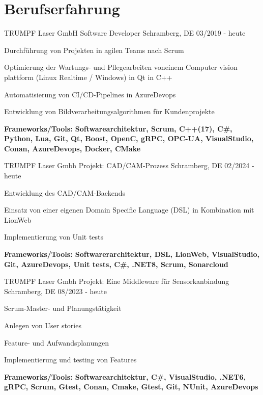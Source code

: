 \section{Berufserfahrung}

\cventry
{TRUMPF Laser GmbH} %
{Software Developer } %
{Schramberg, DE} %
{03/2019 - heute} %
\begin{cvitems}
\item{Durchführung von Projekten in agilen Teams nach Scrum}
\item{Optimierung der Wartungs- und Pflegearbeiten voneinem Computer vision plattform (Linux Realtime / Windows) in Qt in C++}
\item{Automatisierung von CI/CD-Pipelines in AzureDevops}
\item{Entwicklung von Bildverarbeitungsalgorithmen für Kundenprojekte}
\item{\textbf{Frameworks/Tools: Softwarearchitektur, Scrum,  C++(17), C\#, Python, Lua, Git, Qt, Boost, OpenC, gRPC, OPC-UA, VisualStudio, Conan, AzureDevops, Docker, CMake}}
\end{cvitems}

\cventry
{TRUMPF Laser Gmbh} %
{Projekt: CAD/CAM-Prozess} %
{Schramberg, DE} %
{02/2024 - heute} %
\begin{cvitems}
	\item{Entwicklung des CAD/CAM-Backends}
	\item{Einsatz von einer eigenen Domain Specific Language (DSL) in Kombination mit LionWeb}
	\item{Implementierung von Unit tests}
	\item{\textbf{Frameworks/Tools: Softwarerarchitektur, DSL, LionWeb, VisualStudio, Git, AzureDevops, Unit tests, C\#, .NET8, Scrum, Sonarcloud}}
\end{cvitems}

\cventry
{TRUMPF Laser Gmbh} %
{Projekt: Eine Middleware für Sensorkanbindung} %
{Schramberg, DE} %
{08/2023 - heute} %
\begin{cvitems}
	\item{Scrum-Master- und Planungstätigkeit}
	\item{Anlegen von User stories}
	\item{Feature- und Aufwandsplanungen}
	\item{Implementierung und testing von Features}
	\item{\textbf{Frameworks/Tools:  Softwarearchitektur, C\#, VisualStudio, .NET6,  gRPC, Scrum,  Gtest, Conan, Cmake, Gtest, Git, NUnit, AzureDevops} }
\end{cvitems}

